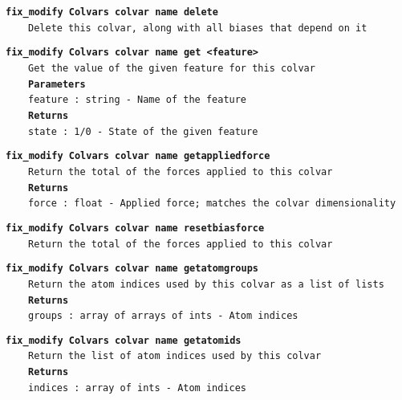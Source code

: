 \begin{mdexampleinput}{}
\texttt{\textbf{fix\_modify Colvars colvar name delete}}
\\
\-~~~~\texttt{Delete this colvar, along with all biases that depend on it}
\end{mdexampleinput}
\begin{mdexampleinput}{}
\texttt{\textbf{fix\_modify Colvars colvar name get <feature>}}
\\
\-~~~~\texttt{Get the value of the given feature for this colvar}
\\
\-~~~~\texttt{\textbf{Parameters}}
\\
\-~~~~\texttt{feature : string - Name of the feature}
\\
\-~~~~\texttt{\textbf{Returns}}
\\
\-~~~~\texttt{state : 1/0 - State of the given feature}
\end{mdexampleinput}
\begin{mdexampleinput}{}
\texttt{\textbf{fix\_modify Colvars colvar name getappliedforce}}
\\
\-~~~~\texttt{Return the total of the forces applied to this colvar}
\\
\-~~~~\texttt{\textbf{Returns}}
\\
\-~~~~\texttt{force : float - Applied force; matches the colvar dimensionality}
\end{mdexampleinput}
\begin{mdexampleinput}{}
\texttt{\textbf{fix\_modify Colvars colvar name resetbiasforce}}
\\
\-~~~~\texttt{Return the total of the forces applied to this colvar}
\end{mdexampleinput}
\begin{mdexampleinput}{}
\texttt{\textbf{fix\_modify Colvars colvar name getatomgroups}}
\\
\-~~~~\texttt{Return the atom indices used by this colvar as a list of lists}
\\
\-~~~~\texttt{\textbf{Returns}}
\\
\-~~~~\texttt{groups : array of arrays of ints - Atom indices}
\end{mdexampleinput}
\begin{mdexampleinput}{}
\texttt{\textbf{fix\_modify Colvars colvar name getatomids}}
\\
\-~~~~\texttt{Return the list of atom indices used by this colvar}
\\
\-~~~~\texttt{\textbf{Returns}}
\\
\-~~~~\texttt{indices : array of ints - Atom indices}
\end{mdexampleinput}
